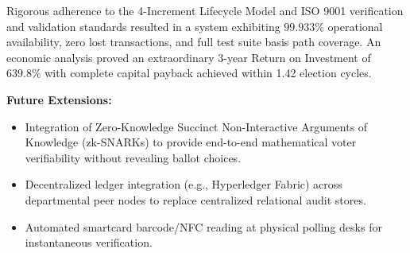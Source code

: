 \documentclass[12pt,a4paper,oneside]{report}
\begin{document}
Rigorous adherence to the 4-Increment Lifecycle Model and ISO 9001 verification and validation standards resulted in a system exhibiting $99.933\%$ operational availability, zero lost transactions, and full test suite basis path coverage. An economic analysis proved an extraordinary 3-year Return on Investment of $639.8\%$ with complete capital payback achieved within 1.42 election cycles.

\vspace{0.4cm}
\noindent \textbf{Future Extensions:}
\begin{itemize}
    \item Integration of Zero-Knowledge Succinct Non-Interactive Arguments of Knowledge (zk-SNARKs) to provide end-to-end mathematical voter verifiability without revealing ballot choices.
    \item Decentralized ledger integration (e.g., Hyperledger Fabric) across departmental peer nodes to replace centralized relational audit stores.
    \item Automated smartcard barcode/NFC reading at physical polling desks for instantaneous verification.
\end{itemize}
\end{document}
